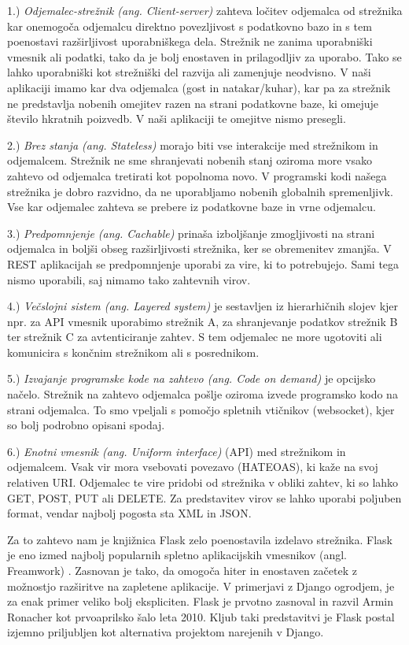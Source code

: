 \documentclass[a4paper, 12pt]{book}
\begin{document}
1.)\textit{ Odjemalec-strežnik (ang. Client-server)} zahteva ločitev odjemalca od strežnika kar onemogoča odjemalcu direktno povezljivost s podatkovno bazo in s tem poenostavi razširljivost uporabniškega dela. Strežnik ne zanima uporabniški vmesnik ali podatki, tako da je bolj enostaven in prilagodljiv za uporabo. Tako se lahko uporabniški kot strežniški del razvija ali zamenjuje neodvisno. V naši aplikaciji imamo kar dva odjemalca (gost in natakar/kuhar), kar pa za strežnik ne predstavlja nobenih omejitev razen na strani podatkovne baze, ki omejuje število hkratnih poizvedb. V naši aplikaciji te omejitve nismo presegli.

2.)\textit{ Brez stanja (ang. Stateless)} morajo biti vse interakcije med strežnikom in odjemalcem. Strežnik ne sme shranjevati nobenih stanj oziroma more vsako zahtevo od odjemalca tretirati kot popolnoma novo. V programski kodi našega strežnika je dobro razvidno, da ne uporabljamo nobenih globalnih spremenljivk. Vse kar odjemalec zahteva se prebere iz podatkovne baze in vrne odjemalcu. 

3.)\textit{ Predpomnjenje (ang. Cachable)} prinaša izboljšanje zmogljivosti na strani odjemalca in boljši obseg razširljivosti strežnika, ker se obremenitev zmanjša. V REST aplikacijah se predpomnjenje uporabi za vire, ki to potrebujejo. Sami tega nismo uporabili, saj nimamo tako zahtevnih virov.

4.)\textit{ Večslojni sistem (ang. Layered system)} je sestavljen iz hierarhičnih slojev kjer npr. za API vmesnik uporabimo strežnik A, za shranjevanje podatkov strežnik B ter strežnik C za avtenticiranje zahtev. S tem odjemalec ne more ugotoviti ali komunicira s končnim strežnikom ali s posrednikom.

5.)\textit{ Izvajanje programske kode na zahtevo (ang. Code on demand)} je opcijsko načelo. Strežnik na zahtevo odjemalca pošlje oziroma izvede programsko kodo na strani odjemalca. To smo vpeljali s pomočjo spletnih vtičnikov (websocket), kjer so bolj podrobno opisani spodaj.

6.)\textit{ Enotni vmesnik (ang. Uniform interface)} (API) med strežnikom in odjemalcem. Vsak vir mora vsebovati povezavo (HATEOAS), ki kaže na svoj relativen URI. Odjemalec te vire pridobi od strežnika v obliki zahtev, ki so lahko GET, POST, PUT ali DELETE. Za predstavitev virov se lahko uporabi poljuben format, vendar najbolj pogosta sta XML in JSON. 

Za to zahtevo nam je knjižnica Flask zelo poenostavila izdelavo strežnika. Flask je eno izmed najbolj popularnih spletno aplikacijskih vmesnikov (angl. Freamwork) \cite{Flask}. Zasnovan je tako, da omogoča hiter in enostaven začetek z možnostjo razširitve na zapletene aplikacije. V primerjavi z Django ogrodjem, je za enak primer veliko bolj ekspliciten. Flask je prvotno zasnoval in razvil Armin Ronacher kot prvoaprilsko šalo leta 2010. Kljub taki predstavitvi je Flask postal izjemno priljubljen kot alternativa projektom narejenih v Django.
\end{document}
